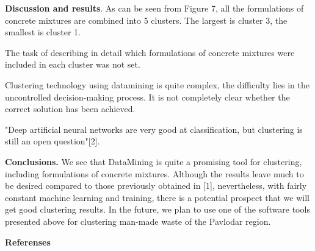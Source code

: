 \begin{multicols}{2}
{\bfseries Discussion and results}. As can be seen from Figure 7, all the
formulations of concrete mixtures are combined into 5 clusters. The
largest is cluster 3, the smallest is cluster 1.

The task of describing in detail which formulations of concrete mixtures
were included in each cluster was not set.

Clustering technology using datamining is quite complex, the difficulty
lies in the uncontrolled decision-making process. It is not completely
clear whether the correct solution has been achieved.

"Deep artificial neural networks are very good at classification, but
clustering is still an open question"{[}2{]}.

{\bfseries Conclusions.} We see that DataMining is quite a promising tool
for clustering, including formulations of concrete mixtures. Although
the results leave much to be desired compared to those previously
obtained in {[}1{]}, nevertheless, with fairly constant machine learning
and training, there is a potential prospect that we will get good
clustering results. In the future, we plan to use one of the software
tools presented above for clustering man-made waste of the Pavlodar
region.
\end{multicols}

\begin{center}
{\bfseries Referenses}
\end{center}

